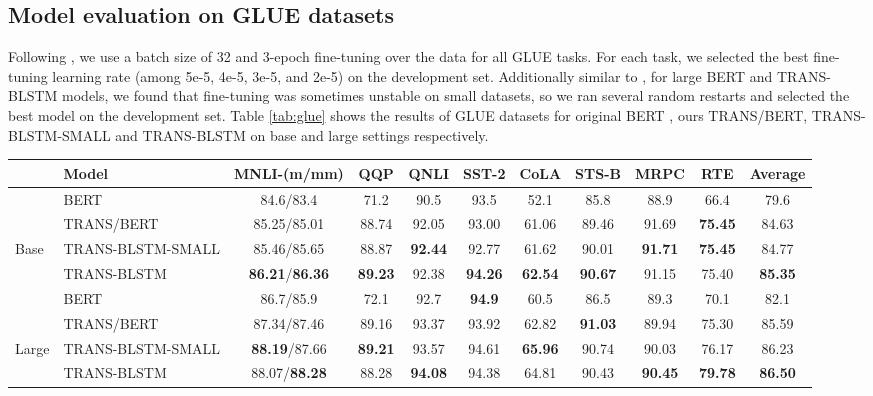 \documentclass[11pt,a4paper]{article}
\begin{document}
\subsection{Model evaluation on GLUE datasets}
Following \cite{devlin2018}, we use a batch size of 32 and 3-epoch fine-tuning over the data for all GLUE tasks. For each task, we selected the best fine-tuning learning rate (among 5e-5, 4e-5, 3e-5, and 2e-5) on the development set. Additionally similar to \cite{devlin2018}, for large BERT and TRANS-BLSTM models, we found that fine-tuning was sometimes unstable on small datasets, so we ran several random restarts and selected the best model on the development set. Table \ref{tab:glue} shows the results of GLUE datasets for original BERT \cite{devlin2018}, ours TRANS/BERT, TRANS-BLSTM-SMALL and TRANS-BLSTM on base and large settings respectively. 
\begin{table*}[!hbpt]
    \centering
    \scriptsize
    \begin{tabular}{llccccccccc}
    & Model & MNLI-(m/mm) & QQP & QNLI & SST-2 &CoLA& STS-B& MRPC &  RTE  & Average  \\ \hline	
    & BERT \cite{devlin2018} & 84.6/83.4 & 71.2 &  90.5  & 93.5 & 52.1 & 85.8 &  88.9 & 66.4 & 79.6 \\
   & TRANS/BERT & 85.25/85.01 & 88.74 & 92.05 & 93.00 & 61.06 & 89.46 &  91.69 & \textbf{75.45} & 84.63 \\
    Base & TRANS-BLSTM-SMALL & 85.46/85.65 & 88.87 & \textbf{92.44} & 92.77 & 61.62 & 90.01 &  \textbf{91.71} & \textbf{75.45} & 84.77 \\
   & TRANS-BLSTM &             \textbf{86.21}/\textbf{86.36} &  \textbf{89.23}          & 92.38         & \textbf{94.26} & \textbf{62.54} & \textbf{90.67} & 91.15 &  75.40 & \textbf{85.35}\\
    \hline
  & BERT \cite{devlin2018}      & 86.7/85.9   & 72.1  &  92.7     & \textbf{94.9}  & 60.5  & 86.5  &  89.3   & 70.1  & 82.1 \\
 & TRANS/BERT                   & 87.34/87.46 & 89.16 & 93.37     & 93.92 & 62.82 & \textbf{91.03} & 89.94   & 75.30 & 85.59\\
Large & TRANS-BLSTM-SMALL & \textbf{88.19}/87.66 & \textbf{89.21} & 93.57  & 94.61 & \textbf{65.96} & 90.74 & 90.03   & 76.17 & 86.23 \\
 & TRANS-BLSTM & 88.07/\textbf{88.28}     & 88.28 & \textbf{94.08}  & 94.38 & 64.81 & 90.43 & \textbf{90.45}   & \textbf{79.78} & \textbf{86.50} \\
\hline
    \end{tabular}
    \caption{GLUE development results for TRANS/BERT, TRANS-BLSTM-SMALL and TRANS-BLSTM  on base and large settings respectively. }
\label{tab:glue}
\end{table*}
\end{document}
